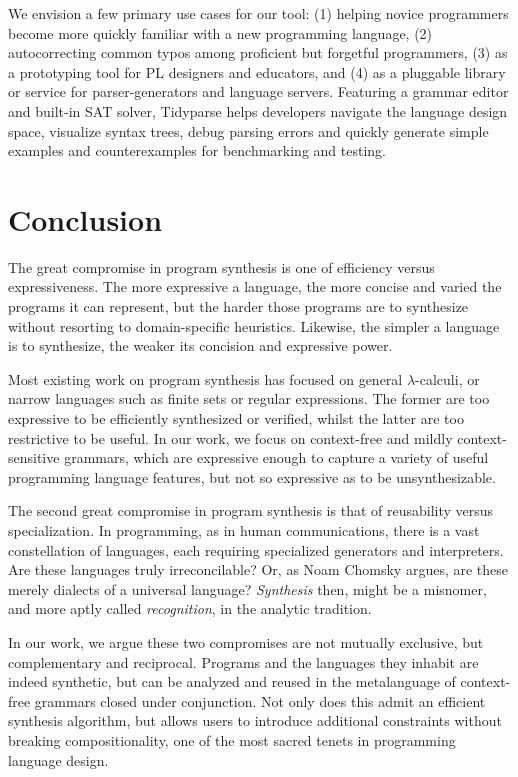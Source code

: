 \documentclass[sigplan,review,anonymous,acmsmall]{acmart}\settopmatter{printfolios=false,printccs=false,printacmref=false}
\begin{document}
We envision a few primary use cases for our tool: (1) helping novice programmers become more quickly familiar with a new programming language, (2) autocorrecting common typos among proficient but forgetful programmers, (3) as a prototyping tool for PL designers and educators, and (4) as a pluggable library or service for parser-generators and language servers. Featuring a grammar editor and built-in SAT solver, Tidyparse helps developers navigate the language design space, visualize syntax trees, debug parsing errors and quickly generate simple examples and counterexamples for benchmarking and testing.

\section{Conclusion}\label{sec:conclusion}


The great compromise in program synthesis is one of efficiency versus expressiveness. The more expressive a language, the more concise and varied the programs it can represent, but the harder those programs are to synthesize without resorting to domain-specific heuristics. Likewise, the simpler a language is to synthesize, the weaker its concision and expressive power.

Most existing work on program synthesis has focused on general $\lambda$-calculi, or narrow languages such as finite sets or regular expressions. The former are too expressive to be efficiently synthesized or verified, whilst the latter are too restrictive to be useful. In our work, we focus on context-free and mildly context-sensitive grammars, which are expressive enough to capture a variety of useful programming language features, but not so expressive as to be unsynthesizable.

The second great compromise in program synthesis is that of reusability versus specialization. In programming, as in human communications, there is a vast constellation of languages, each requiring specialized generators and interpreters. Are these languages truly irreconcilable? Or, as Noam Chomsky argues, are these merely dialects of a universal language? \textit{Synthesis} then, might be a misnomer, and more aptly called \textit{recognition}, in the analytic tradition.

In our work, we argue these two compromises are not mutually exclusive, but complementary and reciprocal. Programs and the languages they inhabit are indeed synthetic, but can be analyzed and reused in the metalanguage of context-free grammars closed under conjunction. Not only does this admit an efficient synthesis algorithm, but allows users to introduce additional constraints without breaking compositionality, one of the most sacred tenets in programming language design.
\end{document}
